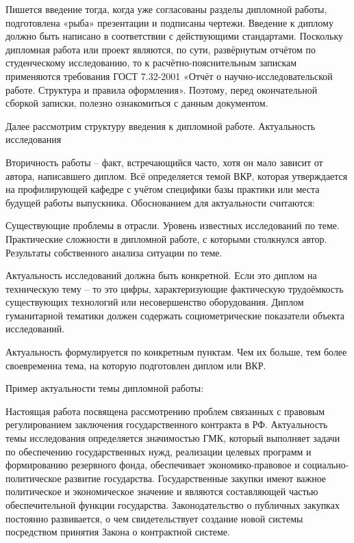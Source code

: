 Пишется введение тогда, когда уже согласованы разделы дипломной работы, подготовлена «рыба» презентации и подписаны чертежи. Введение к диплому должно быть написано в соответствии с действующими стандартами. Поскольку дипломная работа или проект являются, по сути, развёрнутым отчётом по студенческому исследованию, то к расчётно-пояснительным запискам применяются требования ГОСТ  7.32-2001 «Отчёт о научно-исследовательской работе. Структура и правила оформления». Поэтому, перед окончательной сборкой записки, полезно ознакомиться с данным документом.

Далее рассмотрим структуру введения к дипломной работе.
Актуальность исследования

Вторичность работы – факт, встречающийся часто, хотя он мало зависит от автора, написавшего диплом. Всё определяется темой ВКР, которая утверждается на профилирующей кафедре с учётом специфики базы практики или места будущей работы выпускника. Обоснованием для актуальности считаются:

    Существующие проблемы в отрасли.
    Уровень известных исследований по теме.
    Практические сложности в дипломной работе, с которыми столкнулся автор.
    Результаты собственного анализа ситуации по теме.

Актуальность исследований должна быть конкретной. Если это диплом на техническую тему – то это цифры, характеризующие фактическую трудоёмкость существующих технологий или несовершенство оборудования. Диплом гуманитарной тематики должен содержать  социометрические показатели объекта исследований.

Актуальность формулируется по конкретным пунктам. Чем их больше, тем более своевременна тема, на которую подготовлен диплом или ВКР.

    Пример актуальности темы дипломной работы:

    Настоящая работа посвящена рассмотрению проблем связанных с правовым регулированием заключения государственного контракта в РФ. Актуальность темы исследования определяется значимостью ГМК, который выполняет задачи по обеспечению государственных нужд, реализации целевых программ и формированию резервного фонда, обеспечивает экономико-правовое и социально-политическое развитие государства. Государственные закупки имеют важное политическое и экономическое значение и являются составляющей частью обеспечительной функции государства. Законодательство о публичных закупках постоянно развивается, о чем свидетельствует создание новой системы посредством принятия Закона о контрактной системе.

